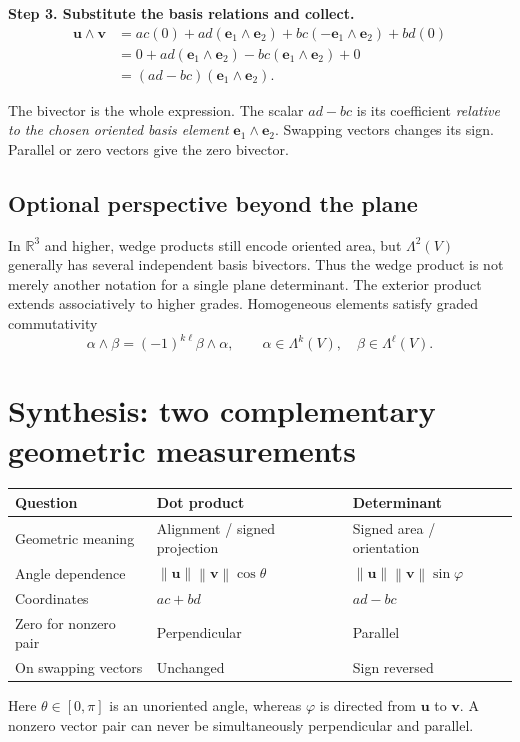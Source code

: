 \documentclass[11pt,letterpaper]{article}
\newcommand{\vect}[1]{\boldsymbol{#1}}
\newcommand{\R}{\mathbb{R}}
\newcommand{\norm}[1]{\left\lVert #1\right\rVert}
\newcommand{\keyeq}[1]{\begin{center}\fbox{\parbox{.91\linewidth}{\centering$\displaystyle #1$}}\end{center}}
\begin{document}
\textbf{Step 3. Substitute the basis relations and collect.}
\[
\begin{aligned}
\vect u\wedge\vect v
&=ac(0)+ad(\vect e_1\wedge\vect e_2)
+bc(-\vect e_1\wedge\vect e_2)+bd(0)\\
&=0+ad(\vect e_1\wedge\vect e_2)-bc(\vect e_1\wedge\vect e_2)+0\\
&=(ad-bc)(\vect e_1\wedge\vect e_2).
\end{aligned}
\]
\keyeq{\vect u\wedge\vect v=\det\begin{pmatrix}a&c\\b&d\end{pmatrix}(\vect e_1\wedge\vect e_2).}
The bivector is the whole expression. The scalar $ad-bc$ is its coefficient \emph{relative to the chosen oriented basis element} $\vect e_1\wedge\vect e_2$. Swapping vectors changes its sign. Parallel or zero vectors give the zero bivector.
\newpage
\subsection*{Optional perspective beyond the plane}
In $\R^3$ and higher, wedge products still encode oriented area, but $\Lambda^2(V)$ generally has several independent basis bivectors. Thus the wedge product is not merely another notation for a single plane determinant. The exterior product extends associatively to higher grades. Homogeneous elements satisfy graded commutativity
\[
\alpha\wedge\beta=(-1)^{k\ell}\beta\wedge\alpha,
\qquad\alpha\in\Lambda^k(V),\quad\beta\in\Lambda^\ell(V).
\]
\section{Synthesis: two complementary geometric measurements}
\begin{center}
\renewcommand{\arraystretch}{1.28}
\begin{tabular}{@{}p{.23\linewidth}p{.32\linewidth}p{.36\linewidth}@{}}
\toprule
\textbf{Question}&\textbf{Dot product}&\textbf{Determinant}\\\midrule
Geometric meaning&Alignment / signed projection&Signed area / orientation\\
Angle dependence&$\norm{\vect u}\norm{\vect v}\cos\theta$&$\norm{\vect u}\norm{\vect v}\sin\varphi$\\
Coordinates&$ac+bd$&$ad-bc$\\
Zero for nonzero pair&Perpendicular&Parallel\\
On swapping vectors&Unchanged&Sign reversed\\
\bottomrule
\end{tabular}
\end{center}
Here $\theta\in[0,\pi]$ is an unoriented angle, whereas $\varphi$ is directed from $\vect u$ to $\vect v$. A nonzero vector pair can never be simultaneously perpendicular and parallel.
\end{document}
